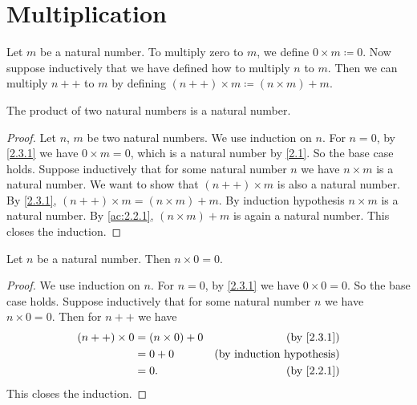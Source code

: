 \section{Multiplication}\label{sec:2.3}

\begin{defn}\label{2.3.1}
  Let \(m\) be a natural number.
  To multiply zero to \(m\), we define \(0 \times m \coloneqq 0\).
  Now suppose inductively that we have defined how to multiply \(n\) to \(m\).
  Then we can multiply \(n++\) to \(m\) by defining \((n++) \times m \coloneqq (n \times m) + m\).
\end{defn}

\begin{ac}\label{ac:2.3.1}
  The product of two natural numbers is a natural number.
\end{ac}

\begin{proof}
  Let \(n\), \(m\) be two natural numbers.
  We use induction on \(n\).
  For \(n = 0\), by \cref{2.3.1} we have \(0 \times m = 0\), which is a natural number by \cref{2.1}.
  So the base case holds.
  Suppose inductively that for some natural number \(n\) we have \(n \times m\) is a natural number.
  We want to show that \((n++) \times m\) is also a natural number.
  By \cref{2.3.1}, \((n++) \times m = (n \times m) + m\).
  By induction hypothesis \(n \times m\) is a natural number.
  By \cref{ac:2.2.1}, \((n \times m) + m\) is again a natural number.
  This closes the induction.
\end{proof}

\begin{ac}\label{ac:2.3.2}
  Let \(n\) be a natural number.
  Then \(n \times 0 = 0\).
\end{ac}

\begin{proof}
  We use induction on \(n\).
  For \(n = 0\), by \cref{2.3.1} we have \(0 \times 0 = 0\).
  So the base case holds.
  Suppose inductively that for some natural number \(n\) we have \(n \times 0 = 0\).
  Then for \(n++\) we have
  \begin{align*}
    (n++) \times 0 & = (n \times 0) + 0 & \text{(by \cref{2.3.1})}         \\
                   & = 0 + 0            & \text{(by induction hypothesis)} \\
                   & = 0.               & \text{(by \cref{2.2.1})}
  \end{align*}
  This closes the induction.
\end{proof}

